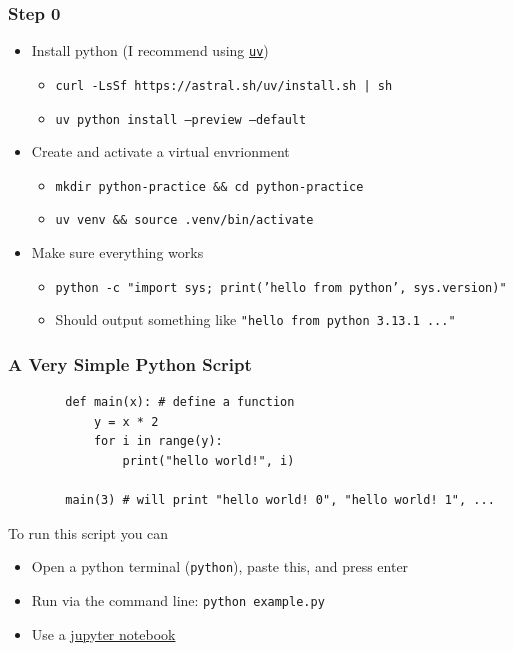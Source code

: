 \documentclass{ali-presentation}
\begin{document}
\begin{frame}
    \frametitle{Step 0}

    \begin{itemize}
        \item Install python
            (I recommend using \href{https://docs.astral.sh/uv/getting-started/installation/}{\texttt{uv}})
            \begin{itemize}
                \item \texttt{curl -LsSf https://astral.sh/uv/install.sh | sh}
                \item \texttt{uv python install --preview --default}
            \end{itemize}
        \item Create and activate a virtual envrionment
            \begin{itemize}
                \item \texttt{mkdir python-practice \&\& cd python-practice}
                \item \texttt{uv venv \&\& source .venv/bin/activate}
            \end{itemize}
        \item Make sure everything works
            \begin{itemize}
                \item \texttt{python -c "import sys; print('hello from python', sys.version)"}
                \item Should output something like \texttt{"hello from python 3.13.1 ..."}
            \end{itemize}
    \end{itemize}
\end{frame}

\begin{frame}[fragile]
    \frametitle{A Very Simple Python Script}

    \begin{verbatim}
        def main(x): # define a function
            y = x * 2
            for i in range(y):
                print("hello world!", i)

        main(3) # will print "hello world! 0", "hello world! 1", ...
    \end{verbatim}
    
    To run this script you can
    \begin{itemize}
        \item Open a python terminal (\texttt{python}), paste this, and press enter
        \item Run via the command line: \texttt{python example.py}
        \item Use a \href{https://jupyter.org}{jupyter notebook}
    \end{itemize}
\end{frame}
\end{document}
